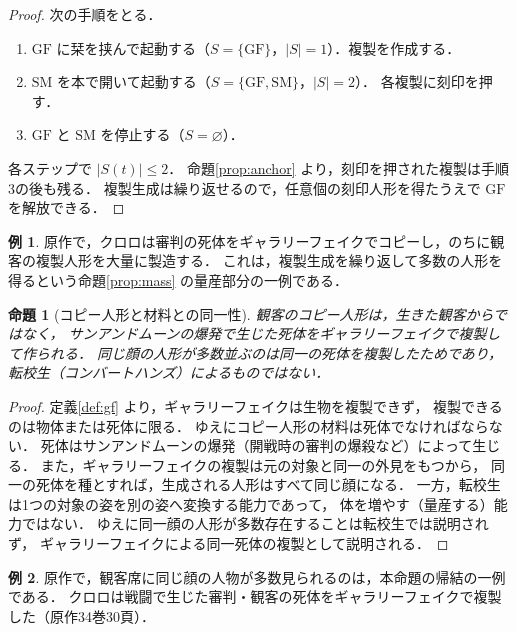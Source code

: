 \documentclass[a4paper,12pt]{jarticle}
\theoremstyle{definition}
\theoremstyle{plain}
\newtheorem{prop}{命題}
\theoremstyle{definition}
\newtheorem{ex}{例}
\theoremstyle{remark}
\newcommand{\Act}{S}   %
\newcommand{\GF}{\mathrm{GF}}    %
\newcommand{\SM}{\mathrm{SM}}    %
\begin{document}
\begin{proof}
次の手順をとる．
\begin{enumerate}
\item $\GF$ に栞を挟んで起動する（$\Act=\{\GF\}$，$|\Act|=1$）．複製を作成する．
\item $\SM$ を本で開いて起動する（$\Act=\{\GF,\SM\}$，$|\Act|=2$）．
      各複製に刻印を押す．
\item $\GF$ と $\SM$ を停止する（$\Act=\varnothing$）．
\end{enumerate}
各ステップで $|\Act(t)|\le 2$．
命題\ref{prop:anchor} より，刻印を押された複製は手順3の後も残る．
複製生成は繰り返せるので，任意個の刻印人形を得たうえで $\GF$ を解放できる．
\end{proof}

\begin{ex}
原作で，クロロは審判の死体をギャラリーフェイクでコピーし，のちに観客の複製人形を大量に製造する．
これは，複製生成を繰り返して多数の人形を得るという命題\ref{prop:mass} の量産部分の一例である．
\end{ex}

\begin{prop}[コピー人形と材料との同一性]\label{prop:copy}
観客のコピー人形は，生きた観客からではなく，
サンアンドムーンの爆発で生じた死体をギャラリーフェイクで複製して作られる．
同じ顔の人形が多数並ぶのは同一の死体を複製したためであり，
転校生（コンバートハンズ）によるものではない．
\end{prop}

\begin{proof}
定義\ref{def:gf} より，ギャラリーフェイクは生物を複製できず，
複製できるのは物体または死体に限る．
ゆえにコピー人形の材料は死体でなければならない．
死体はサンアンドムーンの爆発（開戦時の審判の爆殺など）によって生じる．
また，ギャラリーフェイクの複製は元の対象と同一の外見をもつから，
同一の死体を種とすれば，生成される人形はすべて同じ顔になる．
一方，転校生は1つの対象の姿を別の姿へ変換する能力であって，
体を増やす（量産する）能力ではない．
ゆえに同一顔の人形が多数存在することは転校生では説明されず，
ギャラリーフェイクによる同一死体の複製として説明される．
\end{proof}

\begin{ex}
原作で，観客席に同じ顔の人物が多数見られるのは，本命題の帰結の一例である．
クロロは戦闘で生じた審判・観客の死体をギャラリーフェイクで複製した（原作34巻30頁）．
\end{ex}
\end{document}
